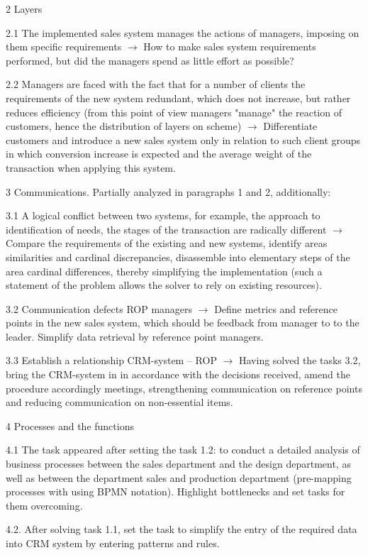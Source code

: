 2 Layers

2.1 The implemented sales system manages the actions of managers, imposing on
them specific requirements $\to$ How to make sales system requirements performed,
but did the managers spend as little effort as possible?

2.2 Managers are faced with the fact that for a number of clients the
requirements of the new system redundant, which does not increase, but rather
reduces efficiency (from this point of view managers "manage" the reaction of
customers, hence the distribution of layers on scheme) $\to$ Differentiate
customers and introduce a new sales system only in relation to such client
groups in which conversion increase is expected and the average weight of the
transaction when applying this system.

3 Communications.  Partially analyzed in paragraphs 1 and 2, additionally:

3.1 A logical conflict between two systems, for example, the approach to
identification of needs, the stages of the transaction are radically different
$\to$ Compare the requirements of the existing and new systems, identify areas
similarities and cardinal discrepancies, disassemble into elementary steps of
the area cardinal differences, thereby simplifying the implementation (such a
statement of the problem allows the solver to rely on existing resources).

3.2 Communication defects ROP managers $\to$ Define metrics and reference points
in the new sales system, which should be feedback from manager to to the
leader. Simplify data retrieval by reference point managers.

3.3 Establish a relationship CRM-system -- ROP $\to$ Having solved the tasks 3.2,
bring the CRM-system in in accordance with the decisions received, amend the
procedure accordingly meetings, strengthening communication on reference
points and reducing communication on non-essential items.

4 Processes and the functions

4.1 The task appeared after setting the task 1.2: to conduct a detailed
analysis of business processes between the sales department and the design
department, as well as between the department sales and production department
(pre-mapping processes with using BPMN notation). Highlight bottlenecks and
set tasks for them overcoming.

4.2.  After solving task 1.1, set the task to simplify the entry of the
required data into CRM system by entering patterns and rules.

